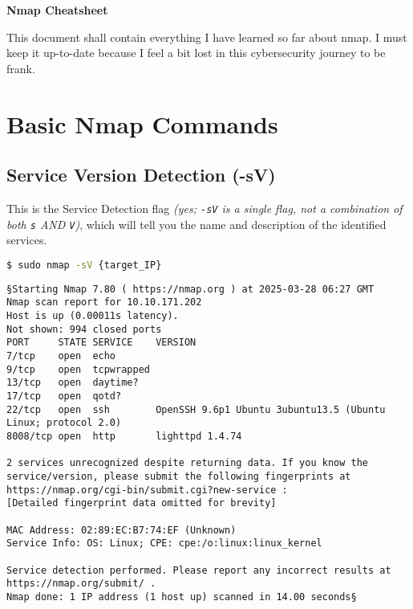 \documentclass[11pt,a4paper]{article}
\newenvironment{commandbox}[1][]{
    \begin{tcolorbox}[
        colback=kalibackground,
        colframe=commandcolor,
        fonttitle=\bfseries\color{white},
        title=#1,
        breakable=true
    ]
}{
    \end{tcolorbox}
}
\begin{document}
\begin{center}
    \begin{tcolorbox}[width=\textwidth, colback=sectioncolor!20, colframe=sectioncolor]
        \centering
        {\Huge \textbf{Nmap Cheatsheet}}\\[0.5em]
    \end{tcolorbox}
\end{center}

\tableofcontents
\clearpage

\vspace{1em}
\begin{tcolorbox}[colback=codebackground, colframe=warningcolor]
    This document shall contain everything I have learned so far about nmap. I must keep it up-to-date because I feel a bit lost in this cybersecurity journey to be frank.
\end{tcolorbox}

\section{Basic Nmap Commands}

\subsection{Service Version Detection (-sV)}

This is the Service Detection flag \textit{(yes; \texttt{-sV} is a single flag, not a combination of both \texttt{s} AND \texttt{V})}, which will tell you the name and description of the identified services.
\begin{commandbox}[Service Version Detection]
\begin{lstlisting}[language=bash]
$ sudo nmap -sV {target_IP}
\end{lstlisting}

\begin{lstlisting}[basicstyle=\ttfamily\small]
§Starting Nmap 7.80 ( https://nmap.org ) at 2025-03-28 06:27 GMT
Nmap scan report for 10.10.171.202
Host is up (0.00011s latency).
Not shown: 994 closed ports
PORT     STATE SERVICE    VERSION
7/tcp    open  echo
9/tcp    open  tcpwrapped
13/tcp   open  daytime?
17/tcp   open  qotd?
22/tcp   open  ssh        OpenSSH 9.6p1 Ubuntu 3ubuntu13.5 (Ubuntu Linux; protocol 2.0)
8008/tcp open  http       lighttpd 1.4.74

2 services unrecognized despite returning data. If you know the service/version, please submit the following fingerprints at https://nmap.org/cgi-bin/submit.cgi?new-service :
[Detailed fingerprint data omitted for brevity]

MAC Address: 02:89:EC:B7:74:EF (Unknown)
Service Info: OS: Linux; CPE: cpe:/o:linux:linux_kernel

Service detection performed. Please report any incorrect results at https://nmap.org/submit/ .
Nmap done: 1 IP address (1 host up) scanned in 14.00 seconds§
\end{lstlisting}
\end{commandbox}
\end{document}
